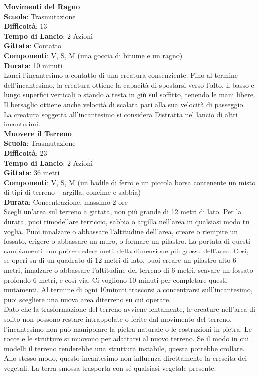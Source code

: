 \begin{multicols}{2}
\medskip\textbf{Movimenti del Ragno}\\
\textbf{Scuola}: Trasmutazione\\
\textbf{Difficoltà}:  13\\
\textbf{Tempo di Lancio}: 2 Azioni\\
\textbf{Gittata}: Contatto\\
\textbf{Componenti}: V, S, M (una goccia di bitume e un ragno)\\
\textbf{Durata}: 10 minuti \\
Lanci l'incantesimo a contatto di una creatura consenziente. Fino al termine dell'incantesimo, la creatura ottiene la capacità di spostarsi verso l’alto, il basso e lungo superfici verticali o stando a testa in giù sul soffitto, tenendo le mani libere. Il bersaglio ottiene anche velocità di scalata pari alla sua velocità di passeggio.\\
La creatura soggetta all'incantesimo si considera Distratta nel lancio di altri incantesimi.\\

\medskip\textbf{Muovere il Terreno}\\
\textbf{Scuola}: Trasmutazione\\
\textbf{Difficoltà}:  23\\
\textbf{Tempo di Lancio}: 2 Azioni\\
\textbf{Gittata}: 36 metri\\
\textbf{Componenti}: V, S, M (un badile di ferro e un piccola borsa contenente un misto di tipi di terreno – argilla, concime e sabbia)\\
\textbf{Durata}: Concentrazione, massimo 2 ore\\
Scegli un'area sul terreno a gittata, non più grande di 12 metri di lato. Per la durata, puoi rimodellare terriccio, sabbia o argilla nell'area in qualsiasi modo tu voglia. Puoi innalzare o abbassare l’altitudine dell'area, creare o riempire un fossato, erigere o abbassare un muro, o formare un pilastro. La portata di questi cambiamenti non può eccedere metà della dimensione più grossa dell'area. Così, se operi su di un quadrato di 12 metri di lato, puoi creare un pilastro alto 6 metri, innalzare o abbassare l’altitudine del terreno di 6 metri, scavare un fossato profondo 6 metri, e così via. Ci vogliono 10 minuti per completare questi mutamenti. Al termine di ogni 10minuti trascorsi a concentrarsi  sull'incantesimo, puoi scegliere una nuova area diterreno su cui operare.\\
Dato che la trasformazione del terreno avviene lentamente, le creature nell'area di solito non possono restare intrappolate o ferite dal movimento del terreno. l'incantesimo non può manipolare la pietra naturale o le costruzioni in pietra. Le rocce e le strutture si muovono per adattarsi al nuovo terreno. Se il modo in cui modelli il terreno renderebbe una struttura instabile, questa potrebbe crollare. Allo stesso modo, questo incantesimo non influenza direttamente la crescita dei vegetali. La terra smossa trasporta con sé qualsiasi vegetale presente.


\end{multicols}
